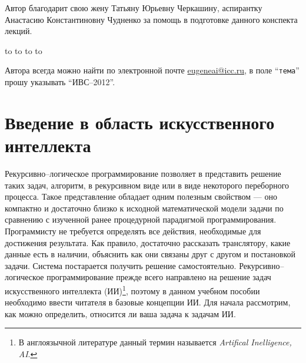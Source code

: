 \documentclass[12pt, openany, twoside]{book} %
\begin{document}
Автор благодарит свою жену Татьяну Юрьевну Черкашину, аспирантку Анастасию
Константиновну Чудненко за помощь в подготовке
данного конспекта лекций.

\medskip
\noindent\hbox to \linewidth{\hfill\sf С.н.с. ИДСТУ СО РАН, доцент кафедры ВТ ИрГТУ,}
\noindent\hbox to \linewidth{\hfill\sf к.т.н. Е.А.Черкашин}
\noindent\hbox to \linewidth{\hfill\sf аспирант кафедры ИТ ИМЭИ ИГУ}
\noindent\hbox to \linewidth{\hfill\sf И.Н.Терехин}

\vfill
\makeatletter
{} Автора всегда можно найти по электронной почте \href{mailto:eugeneai@icc.ru}{eugeneai@icc.ru}, в поле ``{\tt тема}'' прошу указывать ``ИВС--2012''.
\makeatother

\chapter{Введение в область искусственного интеллекта}

Рекурсивно--логическое программирование позволяет в представить решение таких задач, алгоритм, в рекурсивном виде или в виде некоторого переборного процесса. Такое представление обладает одним полезным свойством --- оно компактно и достаточно близко к исходной математической модели задачи по сравнению с изученной ранее процедурной парадигмой программирования. Программисту не требуется определять все действия, необходимые для достижения результата. Как правило, достаточно рассказать транслятору, какие данные есть в наличии, объяснить как они связаны друг с другом и постановкой задачи. Система постарается получить решение самостоятельно. Рекурсивно--логическое программирование прежде всего направлено на решение задач искусственного интеллекта (ИИ)\footnote{В англоязычной литературе данный термин называется \emph{Artifical Inelligence, AI}. }, поэтому в данном учебном пособии необходимо ввести читателя в базовые концепции ИИ. Для начала рассмотрим, как можно определить, относится ли ваша задача к задачам ИИ.
\end{document}
